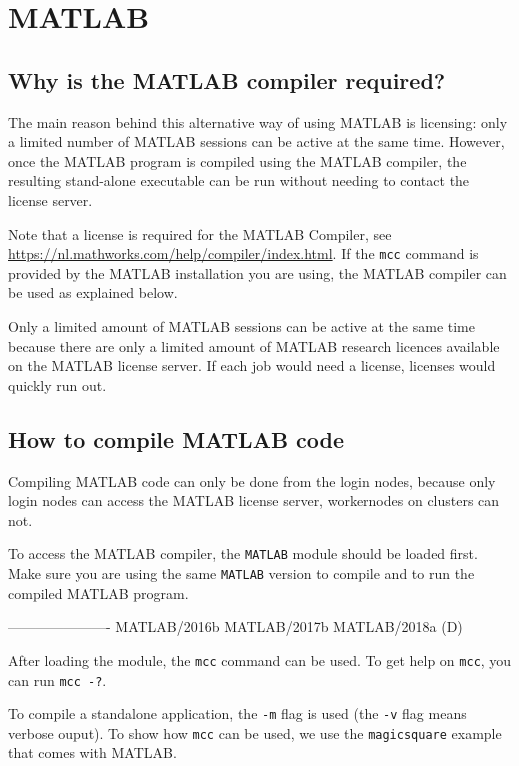 \chapter{MATLAB}
\label{ch:matlab}

\section{Why is the MATLAB compiler required?}

The main reason behind this alternative way of using MATLAB is licensing: only
a limited number of MATLAB sessions can be active at the same time. However, once
the MATLAB program is compiled using the MATLAB compiler, the resulting stand-alone
executable can be run without needing to contact the license server.

Note that a license is required for the MATLAB Compiler,
see \url{https://nl.mathworks.com/help/compiler/index.html}. If the \verb|mcc|
command is provided by the MATLAB installation you are using, the MATLAB compiler
can be used as explained below.

\ifgent
Only a limited amount of MATLAB sessions can be active at the same time because
there are only a limited amount of MATLAB research licences available on
the \university MATLAB license server. If each job would need a license,
licenses would quickly run out.
\fi

\section{How to compile MATLAB code}

Compiling MATLAB code can only be done from the login nodes, because only login
nodes can access the MATLAB license server, workernodes on clusters can not.

To access the MATLAB compiler, the \verb|MATLAB| module should be loaded first. Make sure
you are using the same \verb|MATLAB| version to compile and to run the compiled MATLAB
program.

\begin{prompt}
----------------------%
   MATLAB/2016b    MATLAB/2017b    MATLAB/2018a (D)
\end{prompt}

After loading the module, the \verb|mcc| command can be used. To get help on
\verb|mcc|, you can run \verb|mcc -?|.

To compile a standalone application, the \verb|-m|
flag is used (the \verb|-v| flag means verbose ouput).
To show how \verb|mcc| can be used, we use the \verb|magicsquare| example
that comes with MATLAB.

